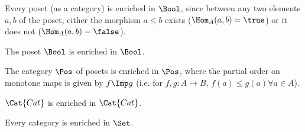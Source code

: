 \begin{example}\label{ex:enrichbool}Every poset (as a category) is enriched in $\Bool$, since between any two elements $a,b$ of the poset, either the morphism $a \leq b$ exists ($\Hom_A(a,b) = \true$) or it does not ($\Hom_A(a,b) = \false$).\end{example}

\begin{example}The poset $\Bool$ is enriched in $\Bool$.\end{example}

\begin{example}The category $\Pos$ of posets is enriched in $\Pos$, where the partial order on monotone maps is given by $f \Imp g$ (i.e. for $f,g : A \to B$, $f(a) \leq g(a) \forall a \in A$).\end{example}

%

\begin{example}$\Cat{Cat}$ is enriched in $\Cat{Cat}$.\end{example}

\begin{example}Every category is enriched in $\Set$.\end{example}



